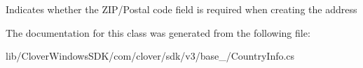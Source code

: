 Indicates whether the Z\+I\+P/\+Postal code field is required when creating the address 



The documentation for this class was generated from the following file\+:\begin{DoxyCompactItemize}
\item 
lib/\+Clover\+Windows\+S\+D\+K/com/clover/sdk/v3/base\+\_\+/Country\+Info.\+cs\end{DoxyCompactItemize}
